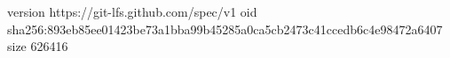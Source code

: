 version https://git-lfs.github.com/spec/v1
oid sha256:893eb85ee01423be73a1bba99b45285a0ca5cb2473c41ccedb6c4e98472a6407
size 626416
